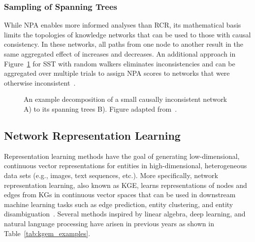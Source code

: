 \subsubsection{Sampling of Spanning Trees}

While \ac{NPA} enables more informed analyses than \ac{RCR}, its mathematical basis limits the topologies of knowledge networks that can be used to those with causal consistency.
In these networks, all paths from one node to another result in the same aggregated effect of increases and decreases.
An additional approach in Figure~\ref{fig:sst_schematic} for \ac{SST} with random walkers eliminates inconsistencies and can be aggregated over multiple trials to assign \ac{NPA} scores to networks that were otherwise inconsistent~\cite{Vasilyev2014}.

\begin{figure}
\captionsetup{format=plain}
\caption[Decomposition of Spanning Trees]{An example decomposition of a small causally inconsistent network A) to its spanning trees B). Figure adapted from~\cite{Vasilyev2014}.}
\label{fig:sst_schematic}
\end{figure}

\subsection{Network Representation Learning}
\label{subsec:nrl}

Representation learning methods have the goal of generating low-dimensional, continuous vector representations for entities in high-dimensional, heterogeneous data sets (e.g., images, text sequences, etc.).
More specifically, network representation learning, also known as \ac{KGE}, learns representations of nodes and edges from \acp{KG} in continuous vector spaces that can be used in downstream machine learning tasks such as edge prediction, entity clustering, and entity disambiguation~\cite{Wang2017}.
Several methods inspired by linear algebra, deep learning, and natural language processing have arisen in previous years as shown in Table~\ref{tab:kgem_examples}.

